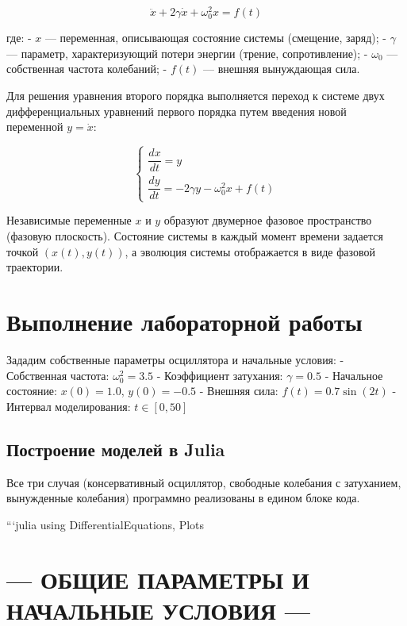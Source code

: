 \documentclass[
  english,
  russian,
  12pt,
  a4paper,
  DIV=11,
  numbers=noendperiod]{scrreprt}
\begin{document}
\[
\ddot{x} + 2\gamma\dot{x} + \omega_0^2 x = f(t)
\]

где: - \(x\) --- переменная, описывающая состояние системы (смещение,
заряд); - \(\gamma\) --- параметр, характеризующий потери энергии
(трение, сопротивление); - \(\omega_0\) --- собственная частота
колебаний; - \(f(t)\) --- внешняя вынуждающая сила.

Для решения уравнения второго порядка выполняется переход к системе двух
дифференциальных уравнений первого порядка путем введения новой
переменной \(y = \dot{x}\):

\[
\begin{cases}
\dfrac{dx}{dt} = y \\
\dfrac{dy}{dt} = -2\gamma y - \omega_0^2 x + f(t)
\end{cases}
\]

Независимые переменные \(x\) и \(y\) образуют двумерное фазовое
пространство (фазовую плоскость). Состояние системы в каждый момент
времени задается точкой \((x(t), y(t))\), а эволюция системы
отображается в виде фазовой траектории.

\chapter{Выполнение лабораторной
работы}\label{ux432ux44bux43fux43eux43bux43dux435ux43dux438ux435-ux43bux430ux431ux43eux440ux430ux442ux43eux440ux43dux43eux439-ux440ux430ux431ux43eux442ux44b}

Зададим собственные параметры осциллятора и начальные условия: -
Собственная частота: \(\omega_0^2 = 3.5\) - Коэффициент затухания:
\(\gamma = 0.5\) - Начальное состояние: \(x(0) = 1.0\), \(y(0) = -0.5\)
- Внешняя сила: \(f(t) = 0.7 \sin(2t)\) - Интервал моделирования:
\(t \in [0, 50]\)

\section{Построение моделей в
Julia}\label{ux43fux43eux441ux442ux440ux43eux435ux43dux438ux435-ux43cux43eux434ux435ux43bux435ux439-ux432-julia}

Все три случая (консервативный осциллятор, свободные колебания с
затуханием, вынужденные колебания) программно реализованы в едином блоке
кода.

```julia using DifferentialEquations, Plots

\chapter{--- ОБЩИЕ ПАРАМЕТРЫ И НАЧАЛЬНЫЕ УСЛОВИЯ
---}\label{ux43eux431ux449ux438ux435-ux43fux430ux440ux430ux43cux435ux442ux440ux44b-ux438-ux43dux430ux447ux430ux43bux44cux43dux44bux435-ux443ux441ux43bux43eux432ux438ux44f}
\end{document}
